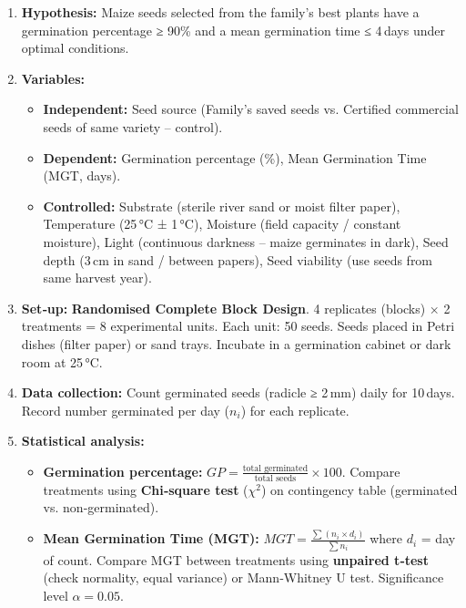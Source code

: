 \documentclass[11pt]{article}
\begin{document}
\begin{exemplebox}
\begin{methode}
\begin{enumerate}
\item \textbf{Hypothesis:} Maize seeds selected from the family’s best plants have a germination percentage ≥ 90\% and a mean germination time ≤ 4 days under optimal conditions.
\item \textbf{Variables:}
\begin{itemize}
    \item \textbf{Independent:} Seed source (Family’s saved seeds vs. Certified commercial seeds of same variety – control).
    \item \textbf{Dependent:} Germination percentage (\%), Mean Germination Time (MGT, days).
    \item \textbf{Controlled:} Substrate (sterile river sand or moist filter paper), Temperature (25 °C ± 1 °C), Moisture (field capacity / constant moisture), Light (continuous darkness – maize germinates in dark), Seed depth (3 cm in sand / between papers), Seed viability (use seeds from same harvest year).
\end{itemize}
\item \textbf{Set‑up:} \textbf{Randomised Complete Block Design}. 4 replicates (blocks) × 2 treatments = 8 experimental units. Each unit: 50 seeds. Seeds placed in Petri dishes (filter paper) or sand trays. Incubate in a germination cabinet or dark room at 25 °C.
\item \textbf{Data collection:} Count germinated seeds (radicle ≥ 2 mm) daily for 10 days. Record number germinated per day (\(n_i\)) for each replicate.
\item \textbf{Statistical analysis:}
\begin{itemize}
    \item \textbf{Germination percentage:} \(GP = \frac{\text{total germinated}}{\text{total seeds}} \times 100\). Compare treatments using \textbf{Chi‑square test} (\(\chi^2\)) on contingency table (germinated vs. non‑germinated).
    \item \textbf{Mean Germination Time (MGT):} \(MGT = \frac{\sum (n_i \times d_i)}{\sum n_i}\) where \(d_i\) = day of count. Compare MGT between treatments using \textbf{unpaired t‑test} (check normality, equal variance) or Mann‑Whitney U test. Significance level \(\alpha = 0.05\).
\end{itemize}
\end{enumerate}
\end{methode}
\end{exemplebox}
\end{document}

